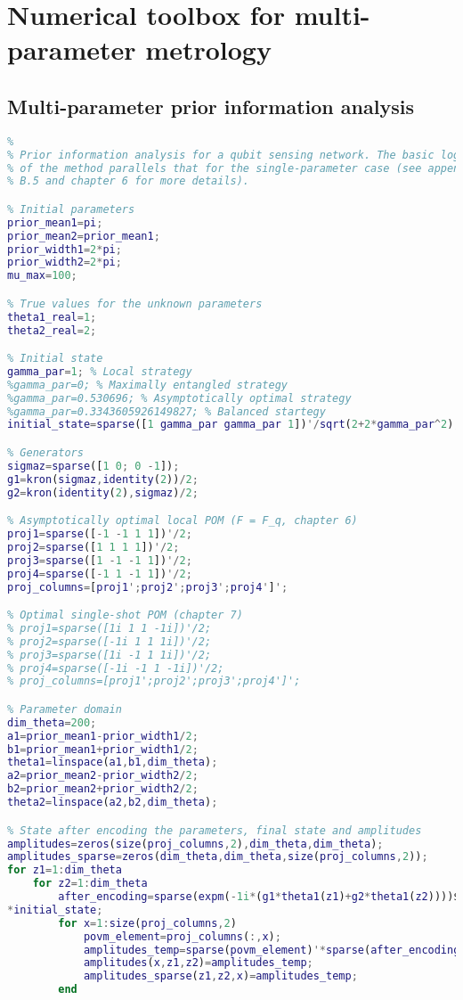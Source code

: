 \chapter{Numerical toolbox for multi-parameter metrology}
\label{app:multinum}

\section{Multi-parameter prior information analysis}
\label{sec:multiprior}

\begin{lstlisting}[language=Matlab, mathescape=true]
% Two-parameter prior information analysis
%
% Prior information analysis for a qubit sensing network. The basic logic
% of the method parallels that for the single-parameter case (see appendix
% B.5 and chapter 6 for more details).

% Initial parameters
prior_mean1=pi; 
prior_mean2=prior_mean1;
prior_width1=2*pi;
prior_width2=2*pi;
mu_max=100;

% True values for the unknown parameters
theta1_real=1;
theta2_real=2;

% Initial state
gamma_par=1; % Local strategy
%gamma_par=0; % Maximally entangled strategy
%gamma_par=0.530696; % Asymptotically optimal strategy
%gamma_par=0.3343605926149827; % Balanced startegy
initial_state=sparse([1 gamma_par gamma_par 1])'/sqrt(2+2*gamma_par^2);

% Generators
sigmaz=sparse([1 0; 0 -1]);
g1=kron(sigmaz,identity(2))/2;
g2=kron(identity(2),sigmaz)/2;

% Asymptotically optimal local POM (F = F_q, chapter 6)
proj1=sparse([-1 -1 1 1])'/2;
proj2=sparse([1 1 1 1])'/2;
proj3=sparse([1 -1 -1 1])'/2;
proj4=sparse([-1 1 -1 1])'/2;
proj_columns=[proj1';proj2';proj3';proj4']';

% Optimal single-shot POM (chapter 7)
% proj1=sparse([1i 1 1 -1i])'/2;
% proj2=sparse([-1i 1 1 1i])'/2;
% proj3=sparse([1i -1 1 1i])'/2;
% proj4=sparse([-1i -1 1 -1i])'/2;
% proj_columns=[proj1';proj2';proj3';proj4']';

% Parameter domain
dim_theta=200;
a1=prior_mean1-prior_width1/2;
b1=prior_mean1+prior_width1/2;
theta1=linspace(a1,b1,dim_theta);
a2=prior_mean2-prior_width2/2;
b2=prior_mean2+prior_width2/2;
theta2=linspace(a2,b2,dim_theta);

% State after encoding the parameters, final state and amplitudes
amplitudes=zeros(size(proj_columns,2),dim_theta,dim_theta);
amplitudes_sparse=zeros(dim_theta,dim_theta,size(proj_columns,2));
for z1=1:dim_theta
    for z2=1:dim_theta
        after_encoding=sparse(expm(-1i*(g1*theta1(z1)+g2*theta1(z2))))$\hspace{0.15em}\swarrow$
*initial_state;
        for x=1:size(proj_columns,2)
            povm_element=proj_columns(:,x);     
            amplitudes_temp=sparse(povm_element)'*sparse(after_encoding);
            amplitudes(x,z1,z2)=amplitudes_temp;
            amplitudes_sparse(z1,z2,x)=amplitudes_temp;
        end


\end{lstlisting}

